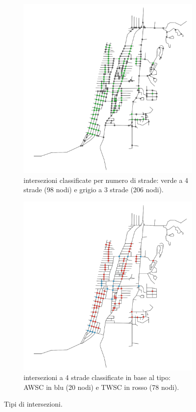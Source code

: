 \begin{figure}[ht]
    \centering
    \begin{subfigure}{0.475\textwidth}
        \includegraphics[width=\textwidth]{images/intersections}
        \caption{intersezioni classificate per numero di strade: verde a 4 strade (98 nodi) e grigio a 3 strade (206 nodi).}
        \label{fig:intersections}
    \end{subfigure}
    \hfill
    \begin{subfigure}{0.475\textwidth}
        \includegraphics[width=\textwidth]{images/int_type}
        \caption{intersezioni a 4 strade classificate in base al tipo: AWSC in blu (20 nodi) e TWSC in rosso (78 nodi).}
        \label{fig:intersections_types}
    \end{subfigure}
    \caption{Tipi di intersezioni.}
    \label{fig:ints_map}
\end{figure}

